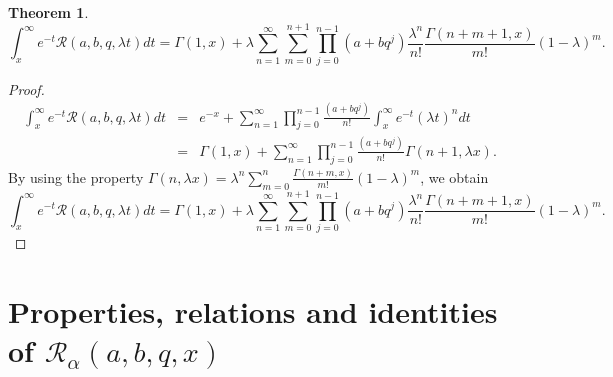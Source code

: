 \documentclass[12pt]{article}
\newtheorem{The}{Theorem}[section]
\numberwithin{equation}{section}
\begin{document}
\begin{The}
\begin{equation*}
\int_{x}^\infty e^{-t}\mathcal{R}(a,b,q,\lambda t)dt = \Gamma (1, x) + 
\lambda \sum_{n=1}^\infty \sum_{m=0}^{n+1} \prod_{j=0}^{n-1}\left(a+bq^j\right)\frac {\lambda^n}{n!} \frac {\Gamma(n+m+1, x)}{m!}(1-\lambda)^m.
\end{equation*}
\end{The}

\begin{proof}
\begin{eqnarray}
\int_{x}^\infty e^{-t}\mathcal{R}(a,b,q,\lambda t)dt &=& e^{-x} +  
\sum_{n=1}^\infty  \prod_{j=0}^{n-1}\frac{\left(a+bq^j\right)}{n!}\int_{x}^\infty e^{-t}(\lambda t)^n dt\nonumber\\
&=& \Gamma(1,x) + \sum_{n=1}^\infty  \prod_{j=0}^{n-1} \frac {\left(a+bq^j\right)}{n!} \Gamma(n+1,\lambda x). 
\end{eqnarray}
By using the property \cite{Gautschi}
 $\Gamma(n,\lambda x) = \lambda^n\sum_{m=0}^n\frac{\Gamma(n+m, x)}{m!}(1-\lambda)^m$, we obtain
 \begin{equation*}
 \int_{x}^\infty e^{-t}\mathcal{R}(a,b,q,\lambda t)dt = \Gamma (1, x) + 
 \lambda \sum_{n=1}^\infty \sum_{m=0}^{n+1} \prod_{j=0}^{n-1}\left(a+bq^j\right)\frac {\lambda^n}{n!} \frac {\Gamma(n+m+1, x)}{m!}(1-\lambda)^m.
 \end{equation*}
 
\end{proof}



\section{Properties, relations and identities of  $\mathcal{R}_\alpha(a,b,q,x)$}\label{Prop}
\end{document}
